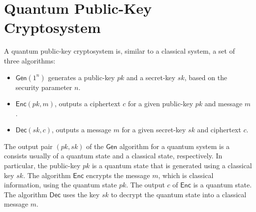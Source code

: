 \documentclass[11pt]{article}
\theoremstyle{plain}
\theoremstyle{definition}
\DeclareMathOperator{\E}{\mathbb{E}}
\DeclarePairedDelimiter{\ket}{\lvert}{\rangle}
\def\gen{\ensuremath{\mathsf{Gen}}}
\def\enc{\ensuremath{\mathsf{Enc}}}
\def\dec{\ensuremath{\mathsf{Dec}}}
\begin{document}






\section{Quantum Public-Key Cryptosystem}

A quantum public-key cryptosystem is, similar to a classical system, a set of three algorithms:
\begin{itemize}[itemsep = 1pt]
\item $\gen(1^n)$ generates a public-key $pk$ and a secret-key $sk$, based on the security parameter $n$.
\item $\enc(pk, m)$, outputs a ciphertext $c$ for a given public-key $pk$ and message $m$.
\item $\dec(sk, c)$, outputs a message $m$ for a given secret-key $sk$ and ciphertext $c$.
\end{itemize}
The output pair $(pk, sk)$ of the $\gen$ algorithm for a quantum system is a consists usually of a quantum state and a classical state, respectively. In particular, the public-key $pk$ is a quantum state that is generated using a classical key $sk$. The algorithm $\enc$ encrypts the message $m$, which is classical information, using the quantum state $pk$. The output $c$ of $\enc$ is a quantum state. The algorithm $\dec$ uses the key $sk$ to decrypt the quantum state into a classical message $m$.
\end{document}
